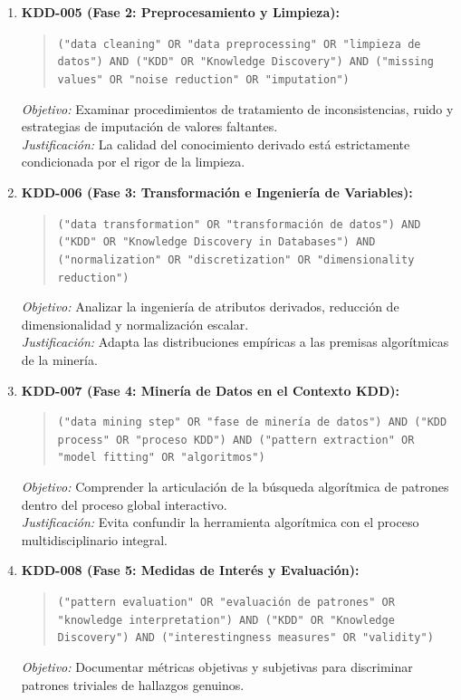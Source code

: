 \begin{enumerate}
  \textit{Justificación:} La correcta delimitación del Target Data evita el sesgo de selección en fases posteriores.
  \item \textbf{KDD-005 (Fase 2: Preprocesamiento y Limpieza):}
  \begin{quote}
  \texttt{("data cleaning" OR "data preprocessing" OR "limpieza de datos") AND ("KDD" OR "Knowledge Discovery") AND ("missing values" OR "noise reduction" OR "imputation")}
  \end{quote}
  \textit{Objetivo:} Examinar procedimientos de tratamiento de inconsistencias, ruido y estrategias de imputación de valores faltantes.\\
  \textit{Justificación:} La calidad del conocimiento derivado está estrictamente condicionada por el rigor de la limpieza.
  \item \textbf{KDD-006 (Fase 3: Transformación e Ingeniería de Variables):}
  \begin{quote}
  \texttt{("data transformation" OR "transformación de datos") AND ("KDD" OR "Knowledge Discovery in Databases") AND ("normalization" OR "discretization" OR "dimensionality reduction")}
  \end{quote}
  \textit{Objetivo:} Analizar la ingeniería de atributos derivados, reducción de dimensionalidad y normalización escalar.\\
  \textit{Justificación:} Adapta las distribuciones empíricas a las premisas algorítmicas de la minería.
  \item \textbf{KDD-007 (Fase 4: Minería de Datos en el Contexto KDD):}
  \begin{quote}
  \texttt{("data mining step" OR "fase de minería de datos") AND ("KDD process" OR "proceso KDD") AND ("pattern extraction" OR "model fitting" OR "algoritmos")}
  \end{quote}
  \textit{Objetivo:} Comprender la articulación de la búsqueda algorítmica de patrones dentro del proceso global interactivo.\\
  \textit{Justificación:} Evita confundir la herramienta algorítmica con el proceso multidisciplinario integral.
  \item \textbf{KDD-008 (Fase 5: Medidas de Interés y Evaluación):}
  \begin{quote}
  \texttt{("pattern evaluation" OR "evaluación de patrones" OR "knowledge interpretation") AND ("KDD" OR "Knowledge Discovery") AND ("interestingness measures" OR "validity")}
  \end{quote}
  \textit{Objetivo:} Documentar métricas objetivas y subjetivas para discriminar patrones triviales de hallazgos genuinos.\\

\end{enumerate}
